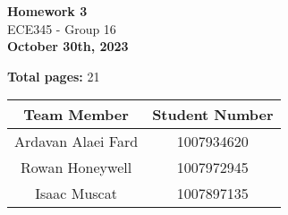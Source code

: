 \begin{titlepage}
    \begin{center}
    {\fontsize{40}{48}\selectfont \bfseries Homework 3} 
    \\\vspace{20pt}
    {\LARGE ECE345 - Group 16} \\
    \vspace{20pt}
    \textbf{October 30th, 2023}
    \vspace{8pt}

    \textbf{Total pages:} 21
    \end{center}

    \begin{table}[!ht]
        \centering
        \begin{tabular}{|c|c|}
        \hline
            \textbf{Team Member} & \textbf{Student Number} \\ \hline
            Ardavan Alaei Fard & 1007934620 \\ \hline
            Rowan Honeywell & 1007972945 \\ \hline
            Isaac Muscat & 1007897135 \\ \hline
        \end{tabular}
    \end{table}
\end{titlepage}